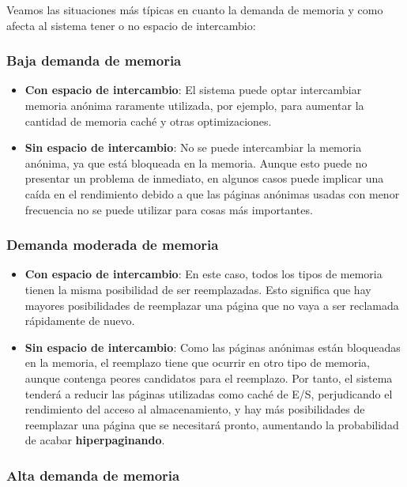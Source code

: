 Veamos las situaciones más típicas en cuanto la demanda de memoria y
como afecta al sistema tener o no espacio de intercambio:

\subsubsection{Baja demanda de memoria}\label{_baja_demanda_de_memoria}

\begin{itemize}
\item
  \textbf{Con espacio de intercambio}: El sistema puede optar
  intercambiar memoria anónima raramente utilizada, por ejemplo, para
  aumentar la cantidad de memoria caché y otras optimizaciones.
\item
  \textbf{Sin espacio de intercambio}: No se puede intercambiar la
  memoria anónima, ya que está bloqueada en la memoria. Aunque esto
  puede no presentar un problema de inmediato, en algunos casos puede
  implicar una caída en el rendimiento debido a que las páginas anónimas
  usadas con menor frecuencia no se puede utilizar para cosas más
  importantes.
\end{itemize}

\subsubsection{Demanda moderada de
memoria}\label{_demanda_moderada_de_memoria}

\begin{itemize}
\item
  \textbf{Con espacio de intercambio}: En este caso, todos los tipos de
  memoria tienen la misma posibilidad de ser reemplazadas. Esto
  significa que hay mayores posibilidades de reemplazar una página que
  no vaya a ser reclamada rápidamente de nuevo.
\item
  \textbf{Sin espacio de intercambio}: Como las páginas anónimas están
  bloqueadas en la memoria, el reemplazo tiene que ocurrir en otro tipo
  de memoria, aunque contenga peores candidatos para el reemplazo. Por
  tanto, el sistema tenderá a reducir las páginas utilizadas como caché
  de E/S, perjudicando el rendimiento del acceso al almacenamiento, y
  hay más posibilidades de reemplazar una página que se necesitará
  pronto, aumentando la probabilidad de acabar \textbf{hiperpaginando}.
\end{itemize}

\subsubsection{Alta demanda de memoria}\label{_alta_demanda_de_memoria}

